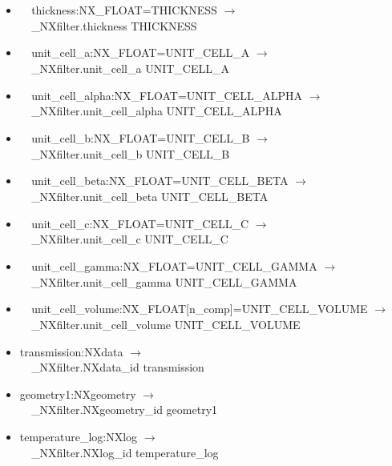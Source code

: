 \documentclass[11pt]{article}
\begin{document}
{{\begin{itemize}
\item{\verb|  |thickness:NX\_FLOAT=THICKNESS $\rightarrow$\\
\verb|  |\_NXfilter.thickness THICKNESS}

\item{\verb|  |unit\_cell\_a:NX\_FLOAT=UNIT\_CELL\_A $\rightarrow$\\
\verb|  |\_NXfilter.unit\_cell\_a UNIT\_CELL\_A}

\item{\verb|  |unit\_cell\_alpha:NX\_FLOAT=UNIT\_CELL\_ALPHA $\rightarrow$\\
\verb|  |\_NXfilter.unit\_cell\_alpha UNIT\_CELL\_ALPHA}

\item{\verb|  |unit\_cell\_b:NX\_FLOAT=UNIT\_CELL\_B $\rightarrow$\\
\verb|  |\_NXfilter.unit\_cell\_b UNIT\_CELL\_B}

\item{\verb|  |unit\_cell\_beta:NX\_FLOAT=UNIT\_CELL\_BETA $\rightarrow$\\
\verb|  |\_NXfilter.unit\_cell\_beta UNIT\_CELL\_BETA}

\item{\verb|  |unit\_cell\_c:NX\_FLOAT=UNIT\_CELL\_C $\rightarrow$\\
\verb|  |\_NXfilter.unit\_cell\_c UNIT\_CELL\_C}

\item{\verb|  |unit\_cell\_gamma:NX\_FLOAT=UNIT\_CELL\_GAMMA $\rightarrow$\\
\verb|  |\_NXfilter.unit\_cell\_gamma UNIT\_CELL\_GAMMA}

\item{\verb|  |unit\_cell\_volume:NX\_FLOAT[n\_comp]=UNIT\_CELL\_VOLUME $\rightarrow$\\
\verb|  |\_NXfilter.unit\_cell\_volume UNIT\_CELL\_VOLUME}

\item{transmission:NXdata $\rightarrow$\\
\verb|  |\_NXfilter.NXdata\_id transmission}

\item{geometry1:NXgeometry $\rightarrow$\\
\verb|  |\_NXfilter.NXgeometry\_id geometry1}

\item{temperature\_log:NXlog $\rightarrow$\\
\verb|  |\_NXfilter.NXlog\_id temperature\_log}


\end{itemize}}}
\end{document}
